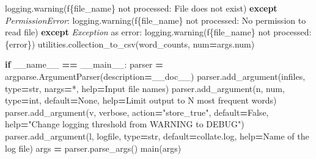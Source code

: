 \documentclass[
]{krantz}
\makeatletter
\newenvironment{Shaded}{\begin{snugshade}}{\end{snugshade}}
\newcommand{\BuiltInTok}[1]{#1}
\newcommand{\ControlFlowTok}[1]{\textcolor[rgb]{0.13,0.29,0.53}{\textbf{#1}}}
\newcommand{\ImportTok}[1]{#1}
\newcommand{\NormalTok}[1]{#1}
\newcommand{\OperatorTok}[1]{\textcolor[rgb]{0.81,0.36,0.00}{\textbf{#1}}}
\newcommand{\PreprocessorTok}[1]{\textcolor[rgb]{0.56,0.35,0.01}{\textit{#1}}}
\newcommand{\SpecialCharTok}[1]{\textcolor[rgb]{0.00,0.00,0.00}{#1}}
\newcommand{\SpecialStringTok}[1]{\textcolor[rgb]{0.31,0.60,0.02}{#1}}
\newcommand{\StringTok}[1]{\textcolor[rgb]{0.31,0.60,0.02}{#1}}
\newcommand{\VariableTok}[1]{\textcolor[rgb]{0.00,0.00,0.00}{#1}}
\newenvironment{kframe}{%
\medskip{}
\setlength{\fboxsep}{.8em}
 \def\at@end@of@kframe{}%
 \ifinner\ifhmode%
  \def\at@end@of@kframe{\end{minipage}}%
  \begin{minipage}{\columnwidth}%
 \fi\fi%
 \def\FrameCommand##1{\hskip\@totalleftmargin \hskip-\fboxsep
 \colorbox{shadecolor}{##1}\hskip-\fboxsep
     \hskip-\linewidth \hskip-\@totalleftmargin \hskip\columnwidth}%
 \MakeFramed {\advance\hsize-\width
   \@totalleftmargin\z@ \linewidth\hsize
   \@setminipage}}%
 {\par\unskip\endMakeFramed%
 \at@end@of@kframe}
\renewenvironment{Shaded}{\begin{kframe}}{\end{kframe}}
\makeatother
\begin{document}
\begin{Shaded}
\begin{Highlighting}[]
\NormalTok{            logging.warning(}\SpecialStringTok{f\textquotesingle{}}\SpecialCharTok{\{}\NormalTok{file\_name}\SpecialCharTok{\}}\SpecialStringTok{ not processed: File does not exist\textquotesingle{}}\NormalTok{)}
        \ControlFlowTok{except} \PreprocessorTok{PermissionError}\NormalTok{:}
\NormalTok{            logging.warning(}\SpecialStringTok{f\textquotesingle{}}\SpecialCharTok{\{}\NormalTok{file\_name}\SpecialCharTok{\}}\SpecialStringTok{ not processed: No permission to read file\textquotesingle{}}\NormalTok{)}
        \ControlFlowTok{except} \PreprocessorTok{Exception} \ImportTok{as}\NormalTok{ error:}
\NormalTok{            logging.warning(}\SpecialStringTok{f\textquotesingle{}}\SpecialCharTok{\{}\NormalTok{file\_name}\SpecialCharTok{\}}\SpecialStringTok{ not processed: }\SpecialCharTok{\{}\NormalTok{error}\SpecialCharTok{\}}\SpecialStringTok{\textquotesingle{}}\NormalTok{)}
\NormalTok{    utilities.collection\_to\_csv(word\_counts, num}\OperatorTok{=}\NormalTok{args.num)}

\ControlFlowTok{if} \VariableTok{\_\_name\_\_} \OperatorTok{==} \StringTok{\textquotesingle{}\_\_main\_\_\textquotesingle{}}\NormalTok{:}
\NormalTok{    parser }\OperatorTok{=}\NormalTok{ argparse.ArgumentParser(description}\OperatorTok{=}\NormalTok{\_\_doc\_\_)}
\NormalTok{    parser.add\_argument(}\StringTok{\textquotesingle{}infiles\textquotesingle{}}\NormalTok{, }\BuiltInTok{type}\OperatorTok{=}\BuiltInTok{str}\NormalTok{, nargs}\OperatorTok{=}\StringTok{\textquotesingle{}*\textquotesingle{}}\NormalTok{, }\BuiltInTok{help}\OperatorTok{=}\StringTok{\textquotesingle{}Input file names\textquotesingle{}}\NormalTok{)}
\NormalTok{    parser.add\_argument(}\StringTok{\textquotesingle{}{-}n\textquotesingle{}}\NormalTok{, }\StringTok{\textquotesingle{}{-}{-}num\textquotesingle{}}\NormalTok{, }\BuiltInTok{type}\OperatorTok{=}\BuiltInTok{int}\NormalTok{, default}\OperatorTok{=}\VariableTok{None}\NormalTok{,}
                        \BuiltInTok{help}\OperatorTok{=}\StringTok{\textquotesingle{}Limit output to N most frequent words\textquotesingle{}}\NormalTok{)}
\NormalTok{    parser.add\_argument(}\StringTok{\textquotesingle{}{-}v\textquotesingle{}}\NormalTok{, }\StringTok{\textquotesingle{}{-}{-}verbose\textquotesingle{}}\NormalTok{, action}\OperatorTok{=}\StringTok{"store\_true"}\NormalTok{, default}\OperatorTok{=}\VariableTok{False}\NormalTok{,}
                        \BuiltInTok{help}\OperatorTok{=}\StringTok{"Change logging threshold from WARNING to DEBUG"}\NormalTok{)}
\NormalTok{    parser.add\_argument(}\StringTok{\textquotesingle{}{-}l\textquotesingle{}}\NormalTok{, }\StringTok{\textquotesingle{}{-}{-}logfile\textquotesingle{}}\NormalTok{, }\BuiltInTok{type}\OperatorTok{=}\BuiltInTok{str}\NormalTok{, default}\OperatorTok{=}\StringTok{\textquotesingle{}collate.log\textquotesingle{}}\NormalTok{,}
                        \BuiltInTok{help}\OperatorTok{=}\StringTok{\textquotesingle{}Name of the log file\textquotesingle{}}\NormalTok{)}
\NormalTok{    args }\OperatorTok{=}\NormalTok{ parser.parse\_args()}
\NormalTok{    main(args)}
\end{Highlighting}
\end{Shaded}
\end{document}

